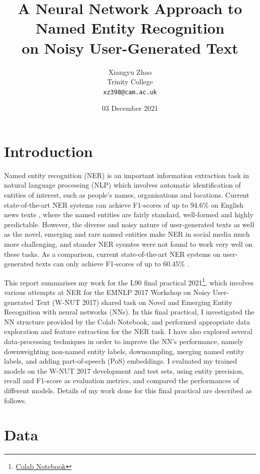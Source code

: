 \documentclass[11pt,a4paper]{article}
\title{A Neural Network Approach to Named Entity Recognition \\ on Noisy User-Generated Text}
\author{Xiangyu Zhao \\
    Trinity College \\
    \texttt{xz398@cam.ac.uk} \\}
\date{03 December 2021}
\begin{document}
\maketitle

\section{Introduction}

Named entity recognition (NER) is an important information extraction task in natural language processing (NLP) which involves automatic identification of entities of interest, such as people's names, organisations and locations. Current state-of-the-art NER systems can achieve F1-scores of up to 94.6\% on English news texts \citep{wang-etal-2021-automated}, where the named entities are fairly standard, well-formed and highly predictable. However, the diverse and noisy nature of user-generated texts as well as the novel, emerging and rare named entities make NER in social media much more challenging, and stander NER sysmtes were not found to work very well on these tasks. As a comparison, current state-of-the-art NER systems on user-generated texts can only achieve F1-scores of up to 60.45\% \citep{wang-etal-2021-improving}.

This report summarises my work for the L90 final practical 2021\footnote{\href{https://colab.research.google.com/drive/1Jw437OCJ-UQskMZJnLFQlTYNNH-rX4PA?usp=sharing}{Colab Notebook}}, which involves various attempts at NER for the EMNLP 2017 Workshop on Noisy User-generated Text (W-NUT 2017) shared task on Novel and Emerging Entity Recognition \citep{derczynski-etal-2017-results} with neural networks (NNs). In this final practical, I investigated the NN structure provided by the Colab Notebook, and performed appropriate data exploration and feature extraction for the NER task. I have also explored several data-processing techniques in order to improve the NN's performance, namely downweighting non-named entity labels, downsampling, merging named entity labels, and adding part-of-speech (PoS) embeddings. I evaluated my trained models on the W-NUT 2017 development and test sets, using entity precision, recall and F1-score as evaluation metrics, and compared the performances of different models. Details of my work done for this final practical are described as follows.

\section{Data}
\end{document}
